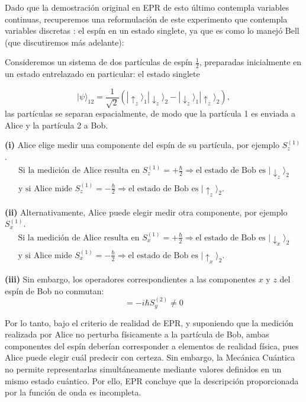 Dado que la demostración original en EPR de esto último contempla variables continuas, recuperemos una reformulación de este experimento que contempla variables discretas \cite{Apuntes}: el espín en un estado singlete, ya que es como lo manejó Bell (que discutiremos más adelante):

Consideremos un sistema de dos partículas de espín $\frac{1}{2}$, preparadas inicialmente en un estado entrelazado en particular: el estado singlete

$$ |\psi\rangle_{12} = \frac{1}{\sqrt{2}} ( |\uparrow_z\rangle_1 |\downarrow_z\rangle_2 - |\downarrow_z\rangle_1 |\uparrow_z\rangle_2 ), $$
las partículas se separan espacialmente, de modo que la partícula 1 es enviada a Alice y la partícula 2 a Bob.

\textbf{(i)} Alice elige medir una componente del espín de su partícula, por ejemplo $S_z^{(1)}$.
\begin{gather*}
	\text{Si la medición de Alice resulta en } S_z^{(1)} = +\frac{\hbar}{2} \Rightarrow \text{el estado de Bob es } |\downarrow_z\rangle_2
	\\
	\text{y si Alice mide } S_z^{(1)} = -\frac{\hbar}{2} \Rightarrow \text{el estado de Bob es } |\uparrow_z\rangle_2.
\end{gather*}

\textbf{(ii)} Alternativamente, Alice puede elegir medir otra componente, por ejemplo $S_x^{(1)}$.
\begin{gather*}
	\text{Si la medición de Alice resulta en } S_x^{(1)} = +\frac{\hbar}{2} \Rightarrow \text{el estado de Bob es } |\downarrow_x\rangle_2
	\\
	\text{y si Alice mide } S_x^{(1)} = -\frac{\hbar}{2} \Rightarrow \text{el estado de Bob es } |\uparrow_x\rangle_2.
\end{gather*}

\textbf{(iii)} Sin embargo, los operadores correspondientes a las componentes $x$ y $z$ del espín de Bob no conmutan:
\begin{equation}
	[S_x^{(2)},S_z^{(2)}] = -i\hbar S_y^{(2)} \neq 0
	\label{eq:contradiccion}
\end{equation}

Por lo tanto, bajo el criterio de realidad de EPR, y suponiendo que la medición realizada por Alice no perturba físicamente a la partícula de Bob, ambas componentes del espín deberían corresponder a elementos de realidad física, pues Alice puede elegir cuál predecir con certeza. Sin embargo, la Mecánica Cuántica no permite representarlas simultáneamente mediante valores definidos en un mismo estado cuántico.  \cite{Apuntes} Por ello, EPR concluye que la descripción proporcionada por la función de onda es incompleta. \cite{EPR}
%
%
%
%
